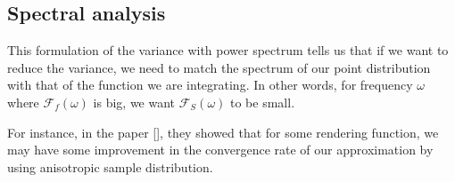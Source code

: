 \documentclass{classeENS}
\begin{document}
    
    
\subsection{Spectral analysis}

\> This formulation of the variance with power spectrum tells us 
    that if we want to reduce the variance, we need to match the 
    spectrum of our point distribution with that of the function 
    we are integrating. In other words, for frequency $\omega$
    where $\mathcal F_f(\omega)$ is big, we want $\mathcal F_S(\omega)$ to be small.

\> For instance, in the paper [\cite{singh17convergence}], they showed that for 
    some rendering function, we may have some improvement in the 
    convergence rate of our approximation by using anisotropic 
    sample distribution.
\end{document}
